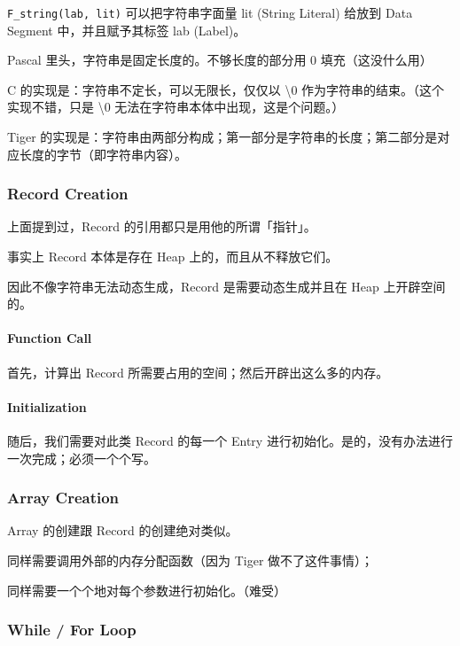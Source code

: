 \documentclass[
]{article}
\begin{document}
\texttt{F\_string(lab,\ lit)} 可以把字符串字面量 lit (String Literal)
给放到 Data Segment 中，并且赋予其标签 lab (Label)。

Pascal 里头，字符串是固定长度的。不够长度的部分用 0 填充（这没什么用）

C 的实现是：字符串不定长，可以无限长，仅仅以 \textbackslash0
作为字符串的结束。（这个实现不错，只是 \textbackslash0
无法在字符串本体中出现，这是个问题。）

Tiger
的实现是：字符串由两部分构成；第一部分是字符串的长度；第二部分是对应长度的字节（即字符串内容）。

\hypertarget{header-n37}{%
\subsubsection{Record Creation}\label{header-n37}}

上面提到过，Record 的引用都只是用他的所谓「指针」。

事实上 Record 本体是存在 Heap 上的，而且从不释放它们。

因此不像字符串无法动态生成，Record 是需要动态生成并且在 Heap
上开辟空间的。

\hypertarget{header-n41}{%
\paragraph{Function Call}\label{header-n41}}

首先，计算出 Record 所需要占用的空间；然后开辟出这么多的内存。

\hypertarget{header-n43}{%
\paragraph{Initialization}\label{header-n43}}

随后，我们需要对此类 Record 的每一个 Entry
进行初始化。是的，没有办法进行一次完成；必须一个个写。

\hypertarget{header-n45}{%
\subsubsection{Array Creation}\label{header-n45}}

Array 的创建跟 Record 的创建绝对类似。

同样需要调用外部的内存分配函数（因为 Tiger 做不了这件事情）；

同样需要一个个地对每个参数进行初始化。（难受）

\hypertarget{header-n49}{%
\subsubsection{While / For Loop}\label{header-n49}}
\end{document}
